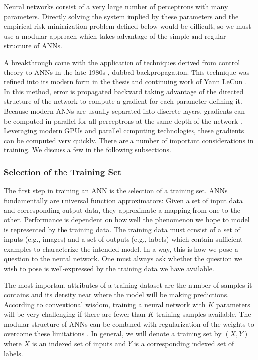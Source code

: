 Neural networks consist of a very large number of perceptrons with many parameters. Directly solving the system implied by these parameters and the empirical risk minimization problem defined below would be difficult, so we must use a
modular approach which takes advantage of the simple and regular structure of ANNs.

 A breakthrough came with the application of techniques derived from control theory to ANNs in the late 1980s \cite{rumelhart1986learning}, dubbed backpropagation. This technique was refined into its modern form in the thesis and continuing work of Yann LeCun \cite{lecun1988theoretical}. In this method, error is propagated backward taking advantage of the directed structure of the network to compute a gradient for each parameter defining it. Because modern ANNs are usually separated into discrete layers, gradients can be computed in parallel for all perceptrons at the same depth of the network
\cite{Bishop:2006:PRM:1162264}. Leveraging modern GPUs and parallel computing technologies, these gradients can be computed very quickly. There are a number of important considerations in training. We discuss a few in the following subsections. 

\subsubsection{Selection of the Training Set}

The first step in training an ANN is the selection of a training set. ANNs fundamentally are universal function approximators: Given a set of input data and corresponding output data, they approximate a mapping from one to the other. Performance is dependent on how well the phenomenon we hope to model is represented by the training data. The training data must consist of a set of inputs (e.g., images) and a set of outputs (e.g., labels) which contain sufficient examples to characterize the intended model. In a way, this is how we pose a question to the neural network. One must always ask whether the question we wish to pose is well-expressed by the training data we have available. 

The most important attributes of a training dataset are the number of
samples it contains and its density near where the model will be making predictions. According to conventional wisdom, training a neural network with $K$ parameters
will be very challenging if there are fewer than $K$ training samples
available. The modular structure of ANNs can be combined with regularization of the weights to overcome these limitations \cite{liu2015very}. 
In general, we will denote a training set by $(X,Y)$ where $X$ is an indexed set of inputs and $Y$ is a corresponding indexed set of labels. 

